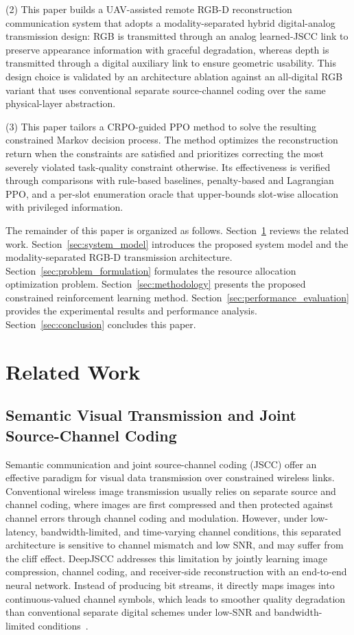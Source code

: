\documentclass[journal]{IEEEtran}
\begin{document}
\noindent(2) This paper builds a UAV-assisted remote RGB-D reconstruction communication system that adopts a modality-separated hybrid digital-analog transmission design: RGB is transmitted through an analog learned-JSCC link to preserve appearance information with graceful degradation, whereas depth is transmitted through a digital auxiliary link to ensure geometric usability. This design choice is validated by an architecture ablation against an all-digital RGB variant that uses conventional separate source-channel coding over the same physical-layer abstraction.

\noindent(3) This paper tailors a CRPO-guided PPO method to solve the resulting constrained Markov decision process. The method optimizes the reconstruction return when the constraints are satisfied and prioritizes correcting the most severely violated task-quality constraint otherwise. Its effectiveness is verified through comparisons with rule-based baselines, penalty-based and Lagrangian PPO, and a per-slot enumeration oracle that upper-bounds slot-wise allocation with privileged information.

The remainder of this paper is organized as follows. Section~\ref{sec:related_work} reviews the related work. Section~\ref{sec:system_model} introduces the proposed system model and the modality-separated RGB-D transmission architecture. Section~\ref{sec:problem_formulation} formulates the resource allocation optimization problem. Section~\ref{sec:methodology} presents the proposed constrained reinforcement learning method. Section~\ref{sec:performance_evaluation} provides the experimental results and performance analysis. Section~\ref{sec:conclusion} concludes this paper.

\section{Related Work}
\label{sec:related_work}
\subsection{Semantic Visual Transmission and Joint Source-Channel Coding}

Semantic communication and joint source-channel coding (JSCC) offer an effective paradigm for visual data transmission over constrained wireless links. Conventional wireless image transmission usually relies on separate source and channel coding, where images are first compressed and then protected against channel errors through channel coding and modulation. However, under low-latency, bandwidth-limited, and time-varying channel conditions, this separated architecture is sensitive to channel mismatch and low SNR, and may suffer from the cliff effect. DeepJSCC addresses this limitation by jointly learning image compression, channel coding, and receiver-side reconstruction with an end-to-end neural network. Instead of producing bit streams, it directly maps images into continuous-valued channel symbols, which leads to smoother quality degradation than conventional separate digital schemes under low-SNR and bandwidth-limited conditions~\cite{B1}.
\end{document}
